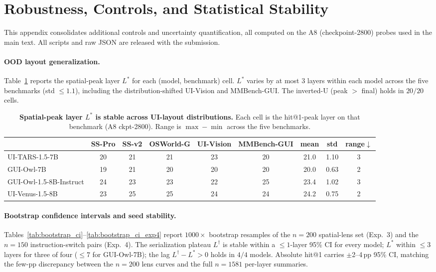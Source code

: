 
\section{Robustness, Controls, and Statistical Stability}
\label{app:controls}

This appendix consolidates additional controls and uncertainty quantification,
all computed on the A8 (checkpoint-2800) probes used in the main
text. All scripts and raw JSON are released with the submission.

\paragraph{OOD layout generalization.}
Table~\ref{tab:ood_peak_layer} reports the spatial-peak layer $L^*$ for each
(model, benchmark) cell. $L^*$ varies by at most $3$ layers within each model
across the five benchmarks (std $\le 1.1$), including the distribution-shifted
UI-Vision and MMBench-GUI. The inverted-U (peak $>$ final) holds in $20/20$ cells.

\begin{table}[!htbp]
\centering\footnotesize\renewcommand{\arraystretch}{0.85}\setlength{\tabcolsep}{3pt}
\begin{tabular}{lcccccccc}
\toprule
& SS-Pro & SS-v2 & OSWorld-G & UI-Vision & MMBench-GUI & mean & std & range$\downarrow$\\
\midrule
UI-TARS-1.5-7B & 20 & 21 & 21 & 23 & 20 & 21.0 & 1.10 & 3\\
GUI-Owl-7B & 19 & 21 & 20 & 20 & 20 & 20.0 & 0.63 & 2\\
GUI-Owl-1.5-8B-Instruct & 24 & 23 & 23 & 22 & 25 & 23.4 & 1.02 & 3\\
UI-Venus-1.5-8B & 23 & 25 & 25 & 24 & 24 & 24.2 & 0.75 & 2\\
\bottomrule
\end{tabular}
\caption{\textbf{Spatial-peak layer $L^*$ is stable across UI-layout distributions.} Each cell is the hit@1-peak layer on that benchmark (A8 ckpt-2800). Range is $\max-\min$ across the five benchmarks.}
\label{tab:ood_peak_layer}
\end{table}

\paragraph{Bootstrap confidence intervals and seed stability.}
Tables~\ref{tab:bootstrap_ci}--\ref{tab:bootstrap_ci_exp4} report $1000\times$
bootstrap resamples of the $n{=}200$ spatial-lens set (Exp.~3) and the $n{=}150$
instruction-switch pairs (Exp.~4). The serialization plateau $L^\dagger$ is
stable within a $\le 1$-layer 95\% CI for every model; $L^*$ within $\le 3$
layers for three of four ($\le 7$ for GUI-Owl-7B); the lag
$L^\dagger - L^* > 0$ holds in $4/4$ models. Absolute hit@1 carries
$\pm$2--4\,pp 95\% CI, matching the few-pp discrepancy between the $n{=}200$
lens curves and the full $n{=}1581$ per-layer summaries.

